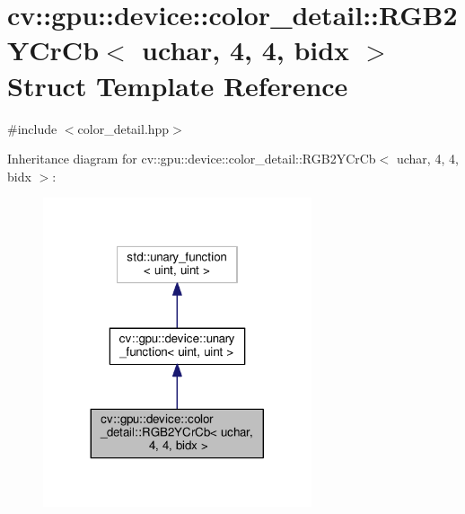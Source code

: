 \hypertarget{structcv_1_1gpu_1_1device_1_1color__detail_1_1RGB2YCrCb_3_01uchar_00_014_00_014_00_01bidx_01_4}{\section{cv\-:\-:gpu\-:\-:device\-:\-:color\-\_\-detail\-:\-:R\-G\-B2\-Y\-Cr\-Cb$<$ uchar, 4, 4, bidx $>$ Struct Template Reference}
\label{structcv_1_1gpu_1_1device_1_1color__detail_1_1RGB2YCrCb_3_01uchar_00_014_00_014_00_01bidx_01_4}
}


{\ttfamily \#include $<$color\-\_\-detail.\-hpp$>$}



Inheritance diagram for cv\-:\-:gpu\-:\-:device\-:\-:color\-\_\-detail\-:\-:R\-G\-B2\-Y\-Cr\-Cb$<$ uchar, 4, 4, bidx $>$\-:\nopagebreak
\begin{figure}[H]
\begin{center}
\leavevmode
\includegraphics[width=224pt]{structcv_1_1gpu_1_1device_1_1color__detail_1_1RGB2YCrCb_3_01uchar_00_014_00_014_00_01bidx_01_4__inherit__graph}
\end{center}
\end{figure}


